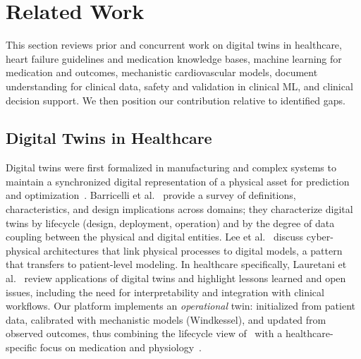 \documentclass[conference]{IEEEtran}
\begin{document}
\section{Related Work}

This section reviews prior and concurrent work on digital twins in healthcare, heart failure guidelines and medication knowledge bases, machine learning for medication and outcomes, mechanistic cardiovascular models, document understanding for clinical data, safety and validation in clinical ML, and clinical decision support. We then position our contribution relative to identified gaps.

\subsection{Digital Twins in Healthcare}
Digital twins were first formalized in manufacturing and complex systems to maintain a synchronized digital representation of a physical asset for prediction and optimization~\cite{grieves2014digital}. Barricelli et al.~\cite{barricelli2019digital} provide a survey of definitions, characteristics, and design implications across domains; they characterize digital twins by lifecycle (design, deployment, operation) and by the degree of data coupling between the physical and digital entities. Lee et al.~\cite{lee2020digital} discuss cyber-physical architectures that link physical processes to digital models, a pattern that transfers to patient-level modeling. In healthcare specifically, Lauretani et al.~\cite{lauretani2020digital} review applications of digital twins and highlight lessons learned and open issues, including the need for interpretability and integration with clinical workflows. Our platform implements an \emph{operational} twin: initialized from patient data, calibrated with mechanistic models (Windkessel), and updated from observed outcomes, thus combining the lifecycle view of~\cite{barricelli2019digital} with a healthcare-specific focus on medication and physiology~\cite{lauretani2020digital}.
\end{document}
